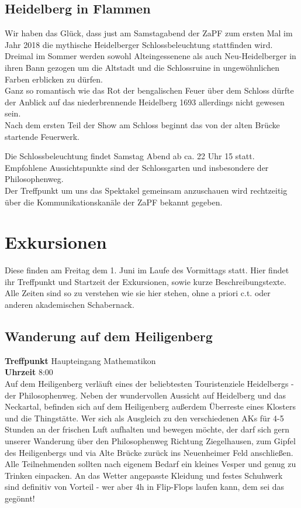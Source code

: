 


\subsection*{Heidelberg in Flammen} %

Wir haben das Glück, dass just am Samstagabend der ZaPF zum ersten Mal im Jahr 2018 die mythische Heidelberger Schlossbeleuchtung stattfinden wird.\\
Dreimal im Sommer werden sowohl Alteingessenene als auch Neu-Heidelberger in ihren Bann gezogen um die Altstadt und die Schlossruine in ungewöhnlichen Farben erblicken zu dürfen.\\
Ganz so romantisch wie das Rot der bengalischen Feuer über dem Schloss dürfte der Anblick auf das niederbrennende Heidelberg 1693 allerdings nicht gewesen sein.\\Nach dem ersten Teil der Show am Schloss beginnt das von der alten Brücke startende Feuerwerk. 

Die Schlossbeleuchtung findet Samstag Abend ab ca. 22 Uhr 15 statt. Empfohlene Aussichtspunkte sind der Schlossgarten und insbesondere der Philosophenweg. \\
Der Treffpunkt um uns das Spektakel gemeinsam anzuschauen wird rechtzeitig über die Kommunikationskanäle der ZaPF bekannt gegeben.


\section*{Exkursionen}

Diese finden am Freitag dem 1. Juni im Laufe des Vormittags statt.
Hier findet ihr Treffpunkt und Startzeit der Exkursionen, sowie kurze Beschreibungstexte.
Alle Zeiten sind so zu verstehen wie sie hier stehen, ohne a priori c.t. oder anderen akademischen Schabernack.

\subsection*{Wanderung auf dem Heiligenberg}
\textbf{Treffpunkt} Haupteingang Mathematikon\\
\textbf{Uhrzeit} 8:00\\
Auf dem Heiligenberg verläuft eines der beliebtesten Touristenziele Heidelbergs - der Philosophenweg. Neben der wundervollen Aussicht auf Heidelberg und das Neckartal, befinden sich auf dem Heiligenberg außerdem Überreste eines Klosters und die Thingstätte. Wer sich als Ausgleich zu den verschiedenen AKs für 4-5 Stunden an der frischen Luft aufhalten und bewegen möchte, der darf sich gern unserer Wanderung über den Philosophenweg Richtung Ziegelhausen, zum Gipfel des Heiligenbergs und via Alte Brücke zurück ins Neuenheimer Feld anschließen. Alle Teilnehmenden sollten nach eigenem Bedarf ein kleines Vesper und genug zu Trinken einpacken. An das Wetter angepasste Kleidung und festes Schuhwerk sind definitiv von Vorteil - wer aber 4h in Flip-Flops laufen kann, dem sei das gegönnt! 

